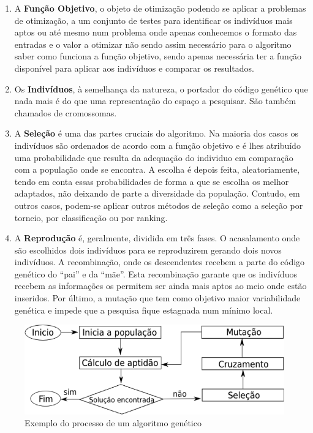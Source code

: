 \begin{enumerate}

\item A \textbf{Função Objetivo}, o objeto de otimização podendo se aplicar a problemas de otimização, a um conjunto de testes para identificar os indivíduos mais aptos ou até mesmo num problema onde apenas conhecemos o formato das entradas e o valor a otimizar não sendo assim necessário para o algoritmo saber como funciona a função objetivo, sendo apenas necessária ter a função disponível para aplicar aos indivíduos e comparar os resultados. 
\item Os \textbf{Indivíduos}, à semelhança da natureza, o portador do código genético que nada mais é do que uma representação do espaço a pesquisar. São também chamados de cromossomas.
\item A \textbf{Seleção} é uma das partes cruciais do algoritmo. Na maioria dos casos os indivíduos são ordenados de acordo com a função objetivo e é lhes atribuído uma probabilidade que resulta da adequação do individuo em comparação com a população onde se encontra. A escolha é depois feita, aleatoriamente, tendo em conta essas probabilidades de forma a que se escolha os melhor adaptados, não deixando de parte a diversidade da população. Contudo, em outros casos, podem-se aplicar outros métodos de seleção como a seleção por torneio, por classificação ou por ranking.
\item A \textbf{Reprodução} é, geralmente, dividida em três fases. O acasalamento onde são escolhidos dois indivíduos para se reproduzirem gerando dois novos indivíduos. A recombinação, onde os descendentes recebem a parte do código genético do “pai” e da “mãe”. Esta recombinação garante que os indivíduos recebem as informações os permitem ser ainda mais aptos ao meio onde estão inseridos. Por último, a mutação que tem como objetivo maior variabilidade genética e impede que a pesquisa fique estagnada num mínimo local.
\end{enumerate}

\begin{figure}[H]
    \centering
    \includegraphics[scale=0.3]{img/ag1.png}
    \caption{Exemplo do processo de um algoritmo genético}
    \label{fig:Processo De Um Algortimo Genetico}
\end{figure}

